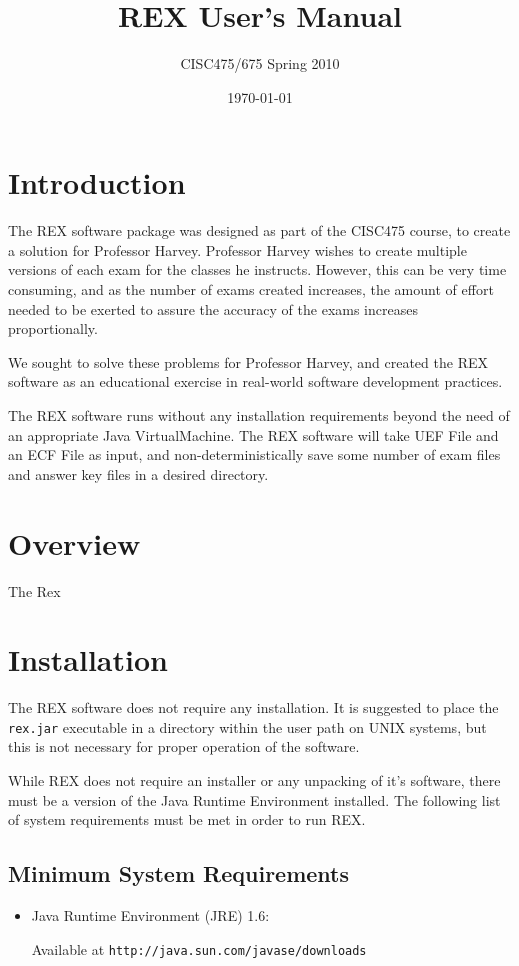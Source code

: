 \documentclass{article}
\author{CISC475/675 Spring 2010}
\title{REX User's Manual}
\date{\today}
\begin{document}
\maketitle
\tableofcontents
\newpage

\section{Introduction}
The REX software package was designed as part of the CISC475 course,
to create a solution for Professor Harvey. Professor Harvey wishes to create
multiple versions of each exam for the classes he instructs. However,
this can be very time consuming, and as the number of exams created
increases, the amount of effort needed to be exerted to assure the
accuracy of the exams increases proportionally.

We sought to solve these problems for Professor Harvey, and created the
REX software as an educational exercise in real-world software
development practices.

The REX software runs without any installation requirements beyond the
need of an appropriate Java VirtualMachine. The REX software will take
UEF File and an ECF File as input, and non-deterministically save
some number of exam files and answer key files in a desired directory.

\section{Overview}
The Rex 

\section{Installation}
The REX software does not require any installation. It is suggested to
place the \texttt{rex.jar} executable in a directory within the user
path on UNIX systems, but this is not necessary for proper operation
of the software.

While REX does not require an installer or any unpacking of it's software,
there must be a version of the Java Runtime Environment installed. The
following list of system requirements must be met in order to run REX.

\subsection{Minimum System Requirements}
\begin{itemize}
\item Java Runtime Environment (JRE) 1.6: 

Available at 
\verb|http://java.sun.com/javase/downloads|
\end{itemize}
\end{document}
